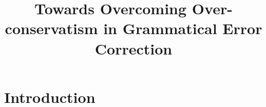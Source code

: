 \documentclass[letter,11pt]{article}
\begin{document}
	
\title{Towards Overcoming Over-conservatism in Grammatical Error Correction}



\maketitle

\begin{abstract}
	
\end{abstract}

\section{Introduction}



\end{document}
